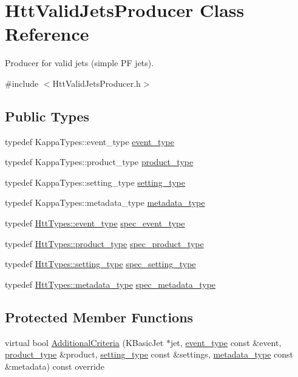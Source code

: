 \hypertarget{classHttValidJetsProducer}{
\section{HttValidJetsProducer Class Reference}
\label{classHttValidJetsProducer}
}


Producer for valid jets (simple PF jets).  


{\ttfamily \#include $<$HttValidJetsProducer.h$>$}\subsection*{Public Types}
\begin{DoxyCompactItemize}
\item 
typedef KappaTypes::event\_\-type \hyperlink{classHttValidJetsProducer_af051e11578ab0d12a1eff72d2a6913e7}{event\_\-type}
\item 
typedef KappaTypes::product\_\-type \hyperlink{classHttValidJetsProducer_ac8070aad2e78408f5cbcf8a2936cbedb}{product\_\-type}
\item 
typedef KappaTypes::setting\_\-type \hyperlink{classHttValidJetsProducer_aaf2948b591d092afb8c357192cb662b2}{setting\_\-type}
\item 
typedef KappaTypes::metadata\_\-type \hyperlink{classHttValidJetsProducer_ad913dcbe01bb00468ac3c24c29d4bf04}{metadata\_\-type}
\item 
typedef \hyperlink{classHttEvent}{HttTypes::event\_\-type} \hyperlink{classHttValidJetsProducer_a3135823745ef67a50362a7837f69b2f5}{spec\_\-event\_\-type}
\item 
typedef \hyperlink{classHttProduct}{HttTypes::product\_\-type} \hyperlink{classHttValidJetsProducer_aa2902f9f59a6eea80e3203a343abb3f8}{spec\_\-product\_\-type}
\item 
typedef \hyperlink{classHttSettings}{HttTypes::setting\_\-type} \hyperlink{classHttValidJetsProducer_a4049404757429f2001746645be5ee9d4}{spec\_\-setting\_\-type}
\item 
typedef \hyperlink{classHttMetadata}{HttTypes::metadata\_\-type} \hyperlink{classHttValidJetsProducer_ae930091764326ded9cbeb6fc228d24ae}{spec\_\-metadata\_\-type}
\end{DoxyCompactItemize}
\subsection*{Protected Member Functions}
\begin{DoxyCompactItemize}
\item 
virtual bool \hyperlink{classHttValidJetsProducer_a368f84a43f5e68388b5eee1a9d6670d4}{AdditionalCriteria} (KBasicJet $\ast$jet, \hyperlink{classHttValidJetsProducer_af051e11578ab0d12a1eff72d2a6913e7}{event\_\-type} const \&event, \hyperlink{classHttValidJetsProducer_ac8070aad2e78408f5cbcf8a2936cbedb}{product\_\-type} \&product, \hyperlink{classHttValidJetsProducer_aaf2948b591d092afb8c357192cb662b2}{setting\_\-type} const \&settings, \hyperlink{classHttValidJetsProducer_ad913dcbe01bb00468ac3c24c29d4bf04}{metadata\_\-type} const \&metadata) const override
\end{DoxyCompactItemize}


